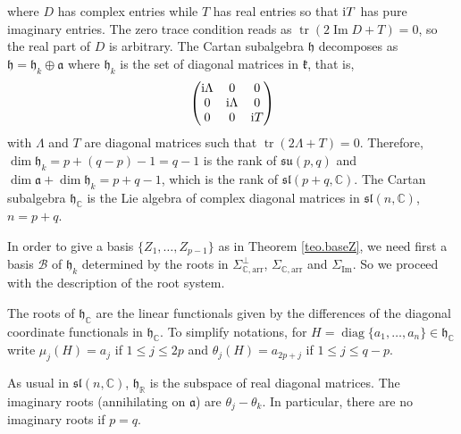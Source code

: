\documentclass[10pt,a4paper]{amsart}
\numberwithin{equation}{section}
\newcommand{\func}[1]{\operatorname{#1}}
\begin{document}
where $D$ has complex entries while $T$ has real entries so that ${\rm i}T$ has pure imaginary entries. The zero trace condition reads as $\operatorname{tr} ( 2\func{Im}D+T ) =0$, so the real part of $D$ is arbitrary. The Cartan subalgebra $\mathfrak{h}$ decomposes as $\mathfrak{h}=\mathfrak{h}_{k}\oplus \mathfrak{a}$ where $\mathfrak{h}_{k}$ is the set of diagonal matrices in $\mathfrak{k}$, that is,
\begin{gather*}
\left(
\begin{matrix}
{\rm i}\Lambda & 0 & 0 \\
0 & {\rm i}\Lambda & 0 \\
0 & 0 & {\rm i}T
\end{matrix}
\right)
\end{gather*}
with $\Lambda $ and $T$ are diagonal matrices such that $\operatorname{tr}(2\Lambda +T)=0$. Therefore, $\dim \mathfrak{h}_{k}=p+(q-p) -1=q-1$ is the rank of $\mathfrak{su}(p,q) $ and $\dim \mathfrak{a}+\dim
\mathfrak{h}_{k}=p+q-1$, which is the rank of $\mathfrak{sl} ( p+q,\mathbb{C} ) $. The Cartan subalgebra $\mathfrak{h}_{\mathbb{C}}$ is the Lie algebra of complex diagonal matrices in $\mathfrak{sl} ( n,\mathbb{C} ) $, $n=p+q$.

In order to give a basis $\{Z_1, \ldots,Z_{p-1}\}$ as in Theorem \ref{teo.baseZ}, we need first a basis $\mathcal{B}$ of $\mathfrak{h }_k$ determined by the roots in $\Sigma_{\mathbb{C},\mathrm{arr}}^\bot$, $\Sigma_{\mathbb{C},\mathrm{arr}}$ and $\Sigma_{\mathrm{Im}}$. So we proceed with the description of the root system.

The roots of $\mathfrak{h}_{\mathbb{C}}$ are the linear functionals given by the differences of the diagonal coordinate functionals in $\mathfrak{h}_{\mathbb{C}}$. To simplify notations, for $H=\operatorname{diag}\{a_{1},\ldots,a_{n}\}\in \mathfrak{h }_\mathbb{C}$ write $\mu _{j}(H) =a_{j}$ if $1\leq j\leq 2p$ and $\theta _{j}(H) =a_{2p+j}$ if $1\leq j\leq q-p$.

As usual in $\mathfrak{sl}( n,\mathbb{C}) $, $\mathfrak{h}_{\mathbb{R}}$ is the subspace of real diagonal matrices. The imaginary roots (annihilating on $\mathfrak{a}$) are $\theta _{j}-\theta _{k}$. In particular, there are no imaginary roots if $p=q$.
\end{document}
